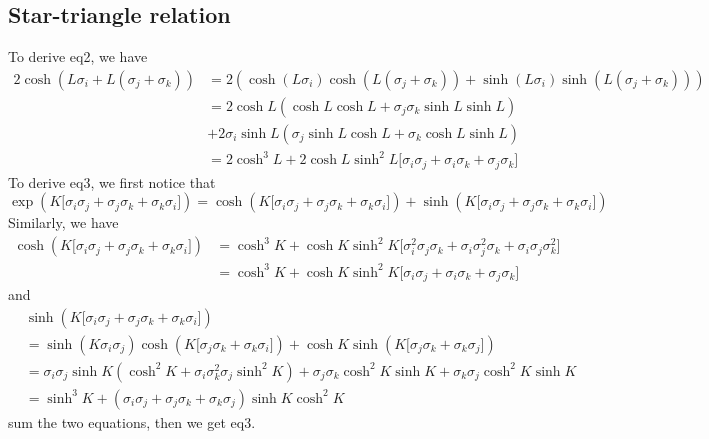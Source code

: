\subsection{Star-triangle relation}
To derive eq2, we have 
\[
\begin{aligned}
2 \cosh(L \sigma_i + L(\sigma_j + \sigma_k)) & = 2(\cosh(L\sigma_i)\cosh(L(\sigma_j + \sigma_k)) + \sinh(L\sigma_i) \sinh(L(\sigma_j + \sigma_k)) )\\
& = 2\cosh L (\cosh L \cosh L + \sigma_j\sigma_k \sinh L \sinh L) \\
&+ 2\sigma_i \sinh L (\sigma_j\sinh L \cosh L + \sigma_k\cosh L \sinh L )\\
& = 2\cosh^3 L + 2\cosh L \sinh^2 L \Big\lbrack \sigma_i \sigma_j + \sigma_i \sigma_k + \sigma_j \sigma_k \Big \rbrack
\end{aligned}
\]
To derive eq3, we first notice that 
\[
\exp(K \lbrack \sigma_i \sigma_j + \sigma_j \sigma_k + \sigma_k \sigma_i \rbrack) = \cosh(K \lbrack \sigma_i \sigma_j + \sigma_j \sigma_k + \sigma_k \sigma_i \rbrack ) + \sinh (K \lbrack \sigma_i \sigma_j + \sigma_j \sigma_k + \sigma_k \sigma_i \rbrack)
\]
Similarly, we have 
\[
\begin{aligned}
\cosh(K \lbrack \sigma_i \sigma_j + \sigma_j \sigma_k + \sigma_k \sigma_i \rbrack ) &= \cosh^3 K + \cosh K \sinh^2 K \Big\lbrack \sigma_i^2 \sigma_j \sigma_k + \sigma_i \sigma_j^2 \sigma_k + \sigma_i \sigma_j \sigma_k^2 \Big \rbrack\\
& = \cosh^3 K + \cosh K \sinh^2 K \Big\lbrack \sigma_i \sigma_j + \sigma_i \sigma_k + \sigma_j \sigma_k \Big \rbrack
\end{aligned}
\]
and 
\[
\begin{aligned}
& \sinh (K \lbrack \sigma_i \sigma_j + \sigma_j \sigma_k + \sigma_k \sigma_i \rbrack ) \\
& = \sinh(K\sigma_i \sigma_j) \cosh (K\lbrack \sigma_j \sigma_k + \sigma_k \sigma_i \rbrack) + \cosh K \sinh ( K \lbrack \sigma_j \sigma_k + \sigma_k \sigma_j \rbrack)\\
& = \sigma_i \sigma_j \sinh K ( \cosh^2 K + \sigma_i \sigma_k^2 \sigma_j \sinh^2 K) + \sigma_j \sigma_k \cosh^2 K \sinh K  + \sigma_k \sigma_j \cosh^2 K \sinh K \\
& =\sinh^3 K + (\sigma_i \sigma_j + \sigma_j \sigma_k + \sigma_k \sigma_j) \sinh K \cosh^2 K
\end{aligned}
\]
sum the two equations, then we get eq3.